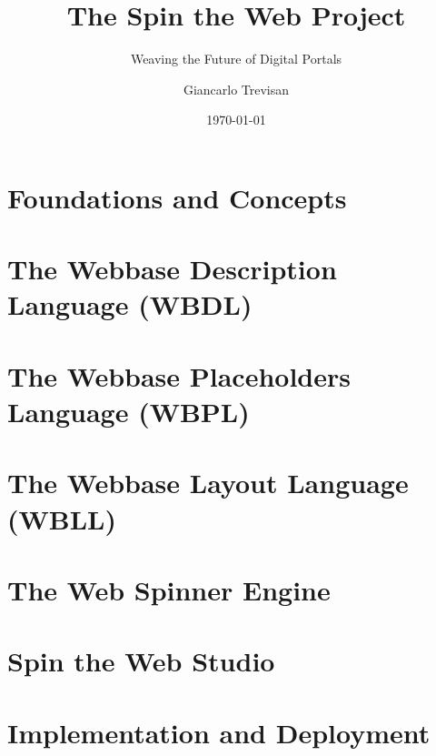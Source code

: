 \documentclass[11pt,openright,twoside,a4paper]{book}
\title{The Spin the Web Project}
\subtitle{Weaving the Future of Digital Portals}
\author{Giancarlo Trevisan}
\date{\today}
\begin{document}
\frontmatter




\tableofcontents

\mainmatter

\part{Foundations and Concepts}






\part{The Webbase Description Language (WBDL)}





\part{The Webbase Placeholders Language (WBPL)}


\part{The Webbase Layout Language (WBLL)}


\part{The Web Spinner Engine}


\part{Spin the Web Studio}


\part{Implementation and Deployment}

\end{document}
